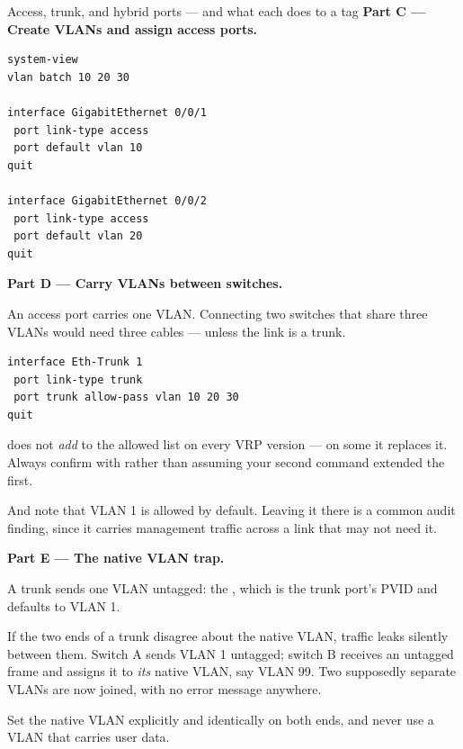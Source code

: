 \begin{labproject}{Access, trunk, and hybrid ports --- and what each does to a tag}
\medskip\noindent\textbf{Part C --- Create VLANs and assign access ports.}\par

\begin{lstlisting}[style=dcnterminal]
system-view
vlan batch 10 20 30

interface GigabitEthernet 0/0/1
 port link-type access
 port default vlan 10
quit

interface GigabitEthernet 0/0/2
 port link-type access
 port default vlan 20
quit
\end{lstlisting}

\medskip\noindent\textbf{Part D --- Carry VLANs between switches.}\par
An access port carries one VLAN. Connecting two switches that share three VLANs would need three cables --- unless the link is a trunk.

\begin{lstlisting}[style=dcnterminal]
interface Eth-Trunk 1
 port link-type trunk
 port trunk allow-pass vlan 10 20 30
quit
\end{lstlisting}

\begin{pitfall}
 does not \emph{add} to the allowed list on every VRP version --- on some it replaces it. Always confirm with  rather than assuming your second command extended the first.

And note that VLAN 1 is allowed by default. Leaving it there is a common audit finding, since it carries management traffic across a link that may not need it.
\end{pitfall}

\medskip\noindent\textbf{Part E --- The native VLAN trap.}\par

\begin{keyidea}
A trunk sends one VLAN untagged: the , which is the trunk port's PVID and defaults to VLAN 1.

If the two ends of a trunk disagree about the native VLAN, traffic leaks silently between them. Switch A sends VLAN 1 untagged; switch B receives an untagged frame and assigns it to \emph{its} native VLAN, say VLAN 99. Two supposedly separate VLANs are now joined, with no error message anywhere.

Set the native VLAN explicitly and identically on both ends, and never use a VLAN that carries user data.
\end{keyidea}


\end{labproject}
